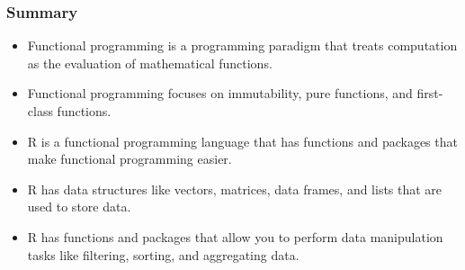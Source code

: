 \documentclass[serif, 9pt, aspectratio=32]{beamer}
\begin{document}
\begin{frame}
    \centering
    \frametitle{Summary}
    \begin{itemize}
        \setlength{\itemsep}{2em}
        \item Functional programming is a programming paradigm that treats computation as the evaluation of mathematical functions.
        \item Functional programming focuses on immutability, pure functions, and first-class functions.
        \item R is a functional programming language that has functions and packages that make functional programming easier.
        \item R has data structures like vectors, matrices, data frames, and lists that are used to store data.
        \item R has functions and packages that allow you to perform data manipulation tasks like filtering, sorting, and aggregating data.
    \end{itemize}
\end{frame}
\end{document}
